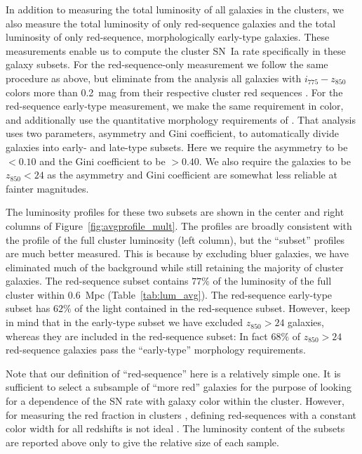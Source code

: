 
In addition to measuring the total luminosity of all galaxies in the
clusters, we also measure the total luminosity of only red-sequence
galaxies and the total luminosity of only red-sequence, morphologically
early-type galaxies. These measurements enable us to compute the
cluster SN~Ia rate specifically in these galaxy subsets. For the
red-sequence-only measurement we follow the same procedure as above,
but eliminate from the analysis all galaxies with $i_{775} - z_{850}$
colors more than 0.2~mag from their respective cluster red sequences
\citep[galaxy colors and cluster red sequences are determined as in][]
{meyers11a}. For the red-sequence early-type measurement, we make the
same requirement in color, and additionally use the quantitative
morphology requirements of \citet{meyers11a}. That analysis uses two
parameters, asymmetry and Gini coefficient, to automatically divide
galaxies into early- and late-type subsets. Here we require the
asymmetry to be $<0.10$ and the Gini coefficient to be $>0.40$. We
also require the galaxies to be $z_{850} < 24$ as the asymmetry and
Gini coefficient are somewhat less reliable at fainter magnitudes.

The luminosity profiles for these two subsets are shown in the center
and right columns of Figure~\ref{fig:avgprofile_mult}. The profiles
are broadly consistent with the profile of the full cluster luminosity
(left column), but the ``subset'' profiles are much better
measured. This is because by excluding bluer galaxies, we have
eliminated much of the background while still retaining the majority
of cluster galaxies. The red-sequence subset contains $77\%$ of the
luminosity of the full cluster within $0.6$~Mpc
(Table~\ref{tab:lum_avg}).  The red-sequence early-type subset has
$62\%$ of the light contained in the red-sequence subset. However,
keep in mind that in the early-type subset we have excluded
$z_{850}>24$ galaxies, whereas they are included in the red-sequence
subset: In fact $68\%$ of $z_{850}>24$ red-sequence galaxies pass the
``early-type'' morphology requirements.

Note that our definition of ``red-sequence'' here is a relatively
simple one. It is sufficient to select a subsample of ``more red''
galaxies for the purpose of looking for a dependence of the SN rate
with galaxy color within the cluster. However, for measuring the red
fraction in clusters
\citep[e.g., the Butcher-Oemler effect][]{butcher78a,butcher84a}, 
defining red-sequences with a constant color width for all redshifts
is not ideal \citep{andreon06d}. The luminosity content of the subsets
are reported above only to give the relative size of each sample.

